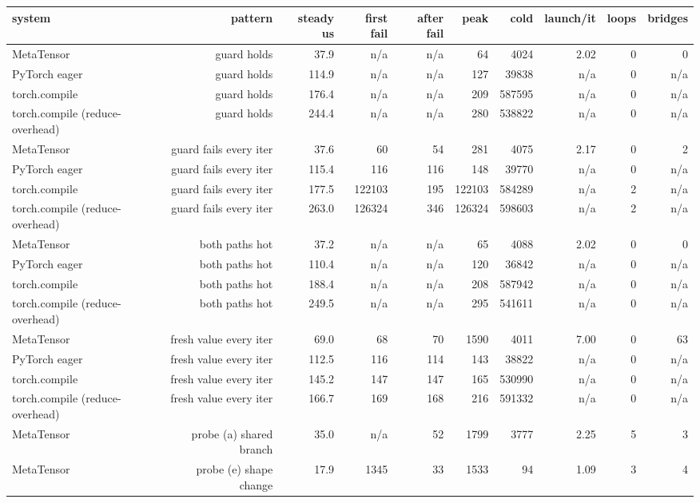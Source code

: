 \begin{tabular}{lrrrrrrrrr}
\toprule
system & pattern & steady us & first fail & after fail & peak & cold & launch/it & loops & bridges \\
\midrule
MetaTensor & guard holds & 37.9 & n/a & n/a & 64 & 4024 & 2.02 & 0 & 0 \\
PyTorch eager & guard holds & 114.9 & n/a & n/a & 127 & 39838 & n/a & 0 & n/a \\
torch.compile & guard holds & 176.4 & n/a & n/a & 209 & 587595 & n/a & 0 & n/a \\
torch.compile (reduce-overhead) & guard holds & 244.4 & n/a & n/a & 280 & 538822 & n/a & 0 & n/a \\
MetaTensor & guard fails every iter & 37.6 & 60 & 54 & 281 & 4075 & 2.17 & 0 & 2 \\
PyTorch eager & guard fails every iter & 115.4 & 116 & 116 & 148 & 39770 & n/a & 0 & n/a \\
torch.compile & guard fails every iter & 177.5 & 122103 & 195 & 122103 & 584289 & n/a & 2 & n/a \\
torch.compile (reduce-overhead) & guard fails every iter & 263.0 & 126324 & 346 & 126324 & 598603 & n/a & 2 & n/a \\
MetaTensor & both paths hot & 37.2 & n/a & n/a & 65 & 4088 & 2.02 & 0 & 0 \\
PyTorch eager & both paths hot & 110.4 & n/a & n/a & 120 & 36842 & n/a & 0 & n/a \\
torch.compile & both paths hot & 188.4 & n/a & n/a & 208 & 587942 & n/a & 0 & n/a \\
torch.compile (reduce-overhead) & both paths hot & 249.5 & n/a & n/a & 295 & 541611 & n/a & 0 & n/a \\
MetaTensor & fresh value every iter & 69.0 & 68 & 70 & 1590 & 4011 & 7.00 & 0 & 63 \\
PyTorch eager & fresh value every iter & 112.5 & 116 & 114 & 143 & 38822 & n/a & 0 & n/a \\
torch.compile & fresh value every iter & 145.2 & 147 & 147 & 165 & 530990 & n/a & 0 & n/a \\
torch.compile (reduce-overhead) & fresh value every iter & 166.7 & 169 & 168 & 216 & 591332 & n/a & 0 & n/a \\
MetaTensor & probe (a) shared branch & 35.0 & n/a & 52 & 1799 & 3777 & 2.25 & 5 & 3 \\
MetaTensor & probe (e) shape change & 17.9 & 1345 & 33 & 1533 & 94 & 1.09 & 3 & 4 \\
\bottomrule
\end{tabular}

